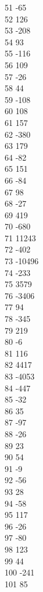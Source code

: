 { 51	-65 \\
 52	126 \\
 53	-208 \\
 54	93 \\
 55	-116 \\
 56	109 \\
 57	-26 \\
 58	44 \\
 59	-108 \\
 60	108 \\
 61	157 \\
 62	-380 \\
 63	179 \\
 64	-82 \\
 65	151 \\
 66	-84 \\
 67	98 \\
 68	-27 \\
 69	419 \\
 70	-680 \\
 71	11243 \\
 72	-402 \\
 73	-10496 \\
 74	-233 \\
 75	3579 \\
 76	-3406 \\
 77	94 \\
 78	-345 \\
 79	219 \\
 80	-6 \\
 81	116 \\
 82	4417 \\
 83	-4053 \\
 84	-447 \\
 85	-32 \\
 86	35 \\
 87	-97 \\
 88	-26 \\
 89	23 \\
 90	54 \\
 91	-9 \\
 92	-56 \\
 93	28 \\
 94	-58 \\
 95	117 \\
 96	-26 \\
 97	-80 \\
 98	123 \\
 99	44 \\
 100	-241 \\
 101	85 \\
}
